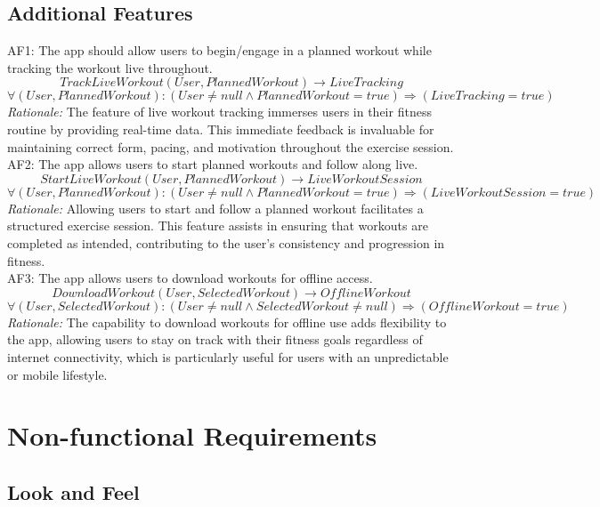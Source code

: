 \documentclass[12pt]{article}
\begin{document}
\subsection{Additional Features}
AF1: The app should allow users to begin/engage in a planned workout while tracking the workout live throughout.
\[TrackLiveWorkout(User, PlannedWorkout) \rightarrow LiveTracking \]
\[ \forall (User, PlannedWorkout): (User \neq null \land PlannedWorkout = true) \Rightarrow (LiveTracking = true) \]
\textit{Rationale:} The feature of live workout tracking immerses users in their fitness routine by providing real-time data. This immediate feedback is invaluable for maintaining correct form, pacing, and motivation throughout the exercise session.
\\

AF2: The app allows users to start planned workouts and follow along live.
\[StartLiveWorkout(User, PlannedWorkout) \rightarrow LiveWorkoutSession \]
\[ \forall (User, PlannedWorkout): (User \neq null \land PlannedWorkout = true) \Rightarrow (LiveWorkoutSession = true) \]
\textit{Rationale:} Allowing users to start and follow a planned workout facilitates a structured exercise session. This feature assists in ensuring that workouts are completed as intended, contributing to the user’s consistency and progression in fitness.
\\

AF3: The app allows users to download workouts for offline access.
\[DownloadWorkout(User, SelectedWorkout) \rightarrow OfflineWorkout \]
\[ \forall (User, SelectedWorkout): (User \neq null \land SelectedWorkout \neq null) \Rightarrow (OfflineWorkout = true) \]
\textit{Rationale:} The capability to download workouts for offline use adds flexibility to the app, allowing users to stay on track with their fitness goals regardless of internet connectivity, which is particularly useful for users with an unpredictable or mobile lifestyle.\\

\section{Non-functional Requirements}

\subsection{Look and Feel}
\end{document}
